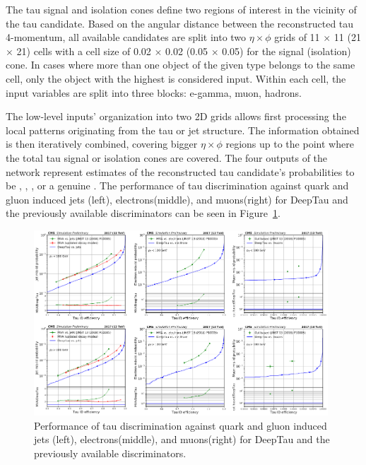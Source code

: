 The tau signal and isolation cones define two regions of interest in the vicinity of the tau candidate. Based on the angular distance between the reconstructed tau 4-momentum, all available candidates are split into two $\eta \times \phi$ grids of 11 $\times$ 11 (21 $\times$ 21) cells with a cell size of 0.02 $\times$ 0.02 (0.05 $\times$ 0.05) for the signal (isolation) cone. In cases where more than one object of the given type belongs to the same cell, only the object with the highest \pt is considered input. Within each cell, the input variables are split into three blocks: e-gamma, muon, hadrons.

The low-level inputs' organization into two 2D grids allows first processing the local patterns originating from the tau or jet structure. The information obtained is then iteratively combined, covering bigger $\eta \times \phi$ regions up to the point where the total tau signal or isolation cones are covered. The four outputs of the network represent estimates of the reconstructed tau candidate's probabilities to be \taue, \taum, \tauj, or a genuine \tauh. The performance of tau discrimination against quark and gluon induced jets (left), electrons(middle), and muons(right) for DeepTau and the previously available discriminators can be seen in Figure~\ref{fig:deeptau}.

\begin{figure}[hbtp]
  \centering
  \includegraphics[width=0.98\textwidth]{plots/chapter5/deeptau.png}
  \caption{Performance of tau discrimination against quark and gluon induced jets (left), electrons(middle), and muons(right) for DeepTau and the previously available discriminators.}
  \label{fig:deeptau}
\end{figure}

